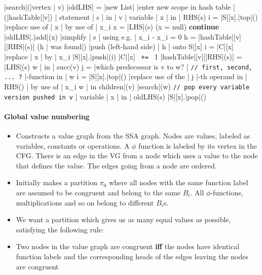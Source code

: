\documentclass[a4paper,12pt, notitlepage]{article}
\renewcommand{\iff}{\textbf{ iff }}
\begin{document}
\pagebreak
\begin{program}
\PROC |search|(|vertex | v) \BODY
    |oldLHS| = |new List|
    |enter new scope in hash table | (|hashTable|[v])
    \FOREACH | statement | s | in | v \DO
        \FOREACH | variable | x | in | RHS(s) \DO
            i = |S|[x].|top|()
            |replace use of | x | by use of | x_i
        \OD
        x = |LHS|(s)
        \IF (x = null) \AR*
            \textbf{continue}
        \FI
        |oldLHS|.|add|(x)
        |simplify | s | using e.g. | x_i - x_i = 0
        h = |hashTable|[v][|RHS|(s)]
        \IF (h | was found|) \AR*
            |push (left-hand side) | h | onto S|[x]
        \ELSE
            i = |C|[x]
            |replace | x | by | x_i
            |S|[x].|push|(i)
            |C|[x] \texttt{ += } 1
            |hashTable|[v][|RHS|(s)] = |LHS|(s)
        \FI
    \OD
    \FOREACH w | in | succ(v) \DO
        j = |which predecessor is v to w? | \hspace{1cm} \texttt{// first, second, ... ?}
        \FOREACH \Phi|-function in | w \DO
            i = |S|[x].|top|()
            |replace use of the | j |-th operand in | RHS(\Phi) | by use of | x_i
        \OD
    \OD
    \FOREACH w | in children|(v) \DO
        |search|(w)
    \texttt{// pop every variable version pushed in v}
    \FOREACH | variable | x | in | oldLHS(s) \DO
        |S|[x].|pop|()
    \OD
\end{program}

\paragraph*{Global value numbering}
\begin{itemize}
\item Constructs a value graph from the SSA graph. Nodes are values, labeled as
variables, constants or operations. A $\phi$ function is labeled by its vertex
in the CFG. There is an edge in the VG from a node which uses a value to the
node that defines the value. The edges going from a node are ordered.
\item Initially makes a partition $\pi_0$ where all nodes with the same function
label are assumed to be congruent and belong to the same $B_i$. All 
$\phi$-functions, multiplications and so on belong to different $B_i$s.
\item We want a partition which gives us as many equal values as possible,
satisfying the following rule:
\item Two nodes in the value graph are congruent \iff the nodes have identical
function labels and the corresponding heads of the edges leaving the nodes are
congruent
\end{itemize}
\end{document}
